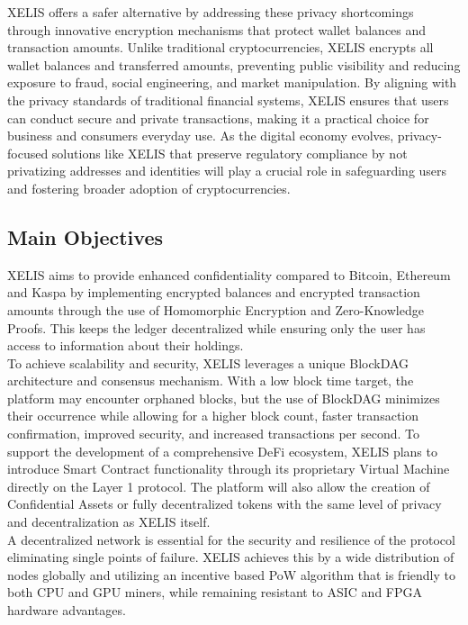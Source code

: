 \documentclass[12pt,a4paper,twocolumn]{article}
\begin{document}
XELIS offers a safer alternative by addressing these privacy shortcomings through innovative encryption mechanisms that protect wallet balances and transaction amounts. Unlike traditional cryptocurrencies, XELIS encrypts all wallet balances and transferred amounts, preventing public visibility and reducing exposure to fraud, social engineering, and market manipulation. By aligning with the privacy standards of traditional financial systems, XELIS ensures that users can conduct secure and private transactions, making it a practical choice for business and consumers everyday use. As the digital economy evolves, privacy-focused solutions like XELIS that preserve regulatory compliance by not privatizing addresses and identities will play a crucial role in safeguarding users and fostering broader adoption of cryptocurrencies.

\subsection{Main Objectives}

XELIS aims to provide enhanced confidentiality compared to Bitcoin, Ethereum and Kaspa by implementing encrypted balances and encrypted transaction amounts through the use of Homomorphic Encryption and Zero-Knowledge Proofs. This keeps the ledger decentralized while ensuring only the user has access to information about their holdings.\\

To achieve scalability and security, XELIS leverages a unique BlockDAG architecture and consensus mechanism. With a low block time target, the platform may encounter orphaned blocks, but the use of BlockDAG minimizes their occurrence while allowing for a higher block count, faster transaction confirmation, improved security, and increased transactions per second. To support the development of a comprehensive DeFi ecosystem, XELIS plans to introduce Smart Contract functionality through its proprietary Virtual Machine directly on the Layer 1 protocol. The platform will also allow the creation of Confidential Assets or fully decentralized tokens with the same level of privacy and decentralization as XELIS itself.\\

A decentralized network is essential for the security and resilience of the protocol eliminating single points of failure. XELIS achieves this by a wide distribution of nodes globally and utilizing an incentive based PoW algorithm that is friendly to both CPU and GPU miners, while remaining resistant to ASIC and FPGA hardware advantages.\\
\end{document}
